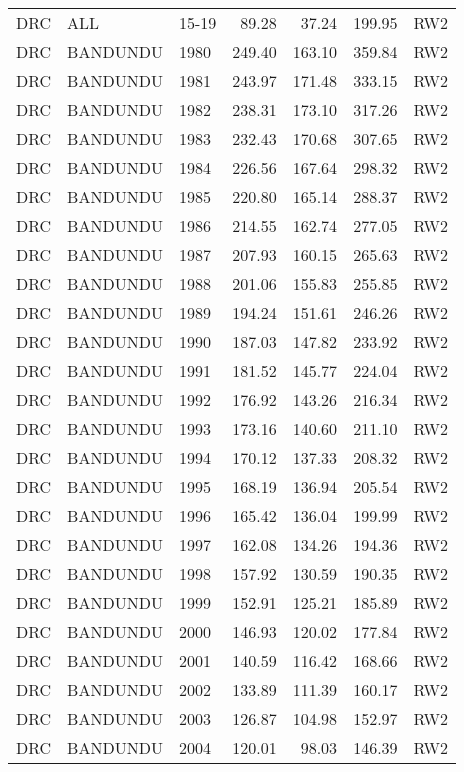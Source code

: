 \begin{longtable}{lllrrrl}
  DRC & ALL & 15-19 & 89.28 & 37.24 & 199.95 & RW2 \\ 
  DRC & BANDUNDU & 1980 & 249.40 & 163.10 & 359.84 & RW2 \\ 
  DRC & BANDUNDU & 1981 & 243.97 & 171.48 & 333.15 & RW2 \\ 
  DRC & BANDUNDU & 1982 & 238.31 & 173.10 & 317.26 & RW2 \\ 
  DRC & BANDUNDU & 1983 & 232.43 & 170.68 & 307.65 & RW2 \\ 
  DRC & BANDUNDU & 1984 & 226.56 & 167.64 & 298.32 & RW2 \\ 
  DRC & BANDUNDU & 1985 & 220.80 & 165.14 & 288.37 & RW2 \\ 
  DRC & BANDUNDU & 1986 & 214.55 & 162.74 & 277.05 & RW2 \\ 
  DRC & BANDUNDU & 1987 & 207.93 & 160.15 & 265.63 & RW2 \\ 
  DRC & BANDUNDU & 1988 & 201.06 & 155.83 & 255.85 & RW2 \\ 
  DRC & BANDUNDU & 1989 & 194.24 & 151.61 & 246.26 & RW2 \\ 
  DRC & BANDUNDU & 1990 & 187.03 & 147.82 & 233.92 & RW2 \\ 
  DRC & BANDUNDU & 1991 & 181.52 & 145.77 & 224.04 & RW2 \\ 
  DRC & BANDUNDU & 1992 & 176.92 & 143.26 & 216.34 & RW2 \\ 
  DRC & BANDUNDU & 1993 & 173.16 & 140.60 & 211.10 & RW2 \\ 
  DRC & BANDUNDU & 1994 & 170.12 & 137.33 & 208.32 & RW2 \\ 
  DRC & BANDUNDU & 1995 & 168.19 & 136.94 & 205.54 & RW2 \\ 
  DRC & BANDUNDU & 1996 & 165.42 & 136.04 & 199.99 & RW2 \\ 
  DRC & BANDUNDU & 1997 & 162.08 & 134.26 & 194.36 & RW2 \\ 
  DRC & BANDUNDU & 1998 & 157.92 & 130.59 & 190.35 & RW2 \\ 
  DRC & BANDUNDU & 1999 & 152.91 & 125.21 & 185.89 & RW2 \\ 
  DRC & BANDUNDU & 2000 & 146.93 & 120.02 & 177.84 & RW2 \\ 
  DRC & BANDUNDU & 2001 & 140.59 & 116.42 & 168.66 & RW2 \\ 
  DRC & BANDUNDU & 2002 & 133.89 & 111.39 & 160.17 & RW2 \\ 
  DRC & BANDUNDU & 2003 & 126.87 & 104.98 & 152.97 & RW2 \\ 
  DRC & BANDUNDU & 2004 & 120.01 & 98.03 & 146.39 & RW2 \\ 

\end{longtable}
